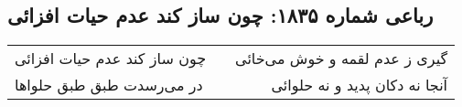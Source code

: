 \begin{center}
\section*{رباعی شماره ۱۸۳۵: چون ساز کند عدم حیات افزائی}
\label{sec:1835}
\begin{longtable}{l p{0.5cm} r}
چون ساز کند عدم حیات افزائی
&&
گیری ز عدم لقمه و خوش می‌خائی
\\
در می‌رسدت طبق طبق حلواها
&&
آنجا نه دکان پدید و نه حلوائی
\\
\end{longtable}
\end{center}
